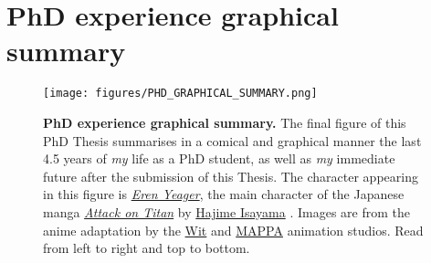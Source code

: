 \chapter*{PhD experience graphical summary}

\renewcommand{\thefigure}{U.\arabic{figure}}

\begin{figure}[htb!]
    \centering
    \texttt{[image: figures/PHD\_GRAPHICAL\_SUMMARY.png]}
    \caption[PhD experience graphical summary]{\textbf{PhD experience graphical summary.} The final figure of this PhD Thesis summarises in a comical and graphical manner the last 4.5 years of \textit{my} life as a PhD student, as well as \textit{my} immediate future after the submission of this Thesis. The character appearing in this figure is \href{https://attackontitan.fandom.com/wiki/Eren_Yeager}{\textit{Eren Yeager}}, the main character of the Japanese manga \href{https://en.wikipedia.org/wiki/Attack_on_Titan}{\textit{Attack on Titan}} by \href{https://en.wikipedia.org/wiki/Hajime_Isayama}{Hajime Isayama} \cite{ISAYAMA_2021}. Images are from the anime adaptation by the \href{https://en.wikipedia.org/wiki/Wit_Studio}{Wit} and \href{https://en.wikipedia.org/wiki/MAPPA}{MAPPA} animation studios. Read from left to right and top to bottom.}
    \label{fig:phd_graph_summary}
\end{figure}